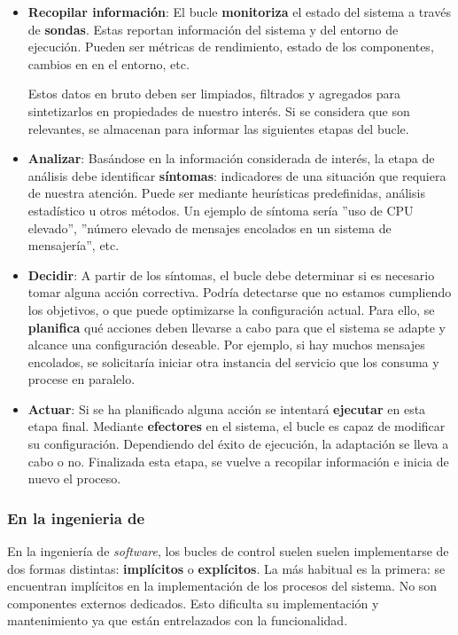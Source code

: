 \begin{itemize}
  \item \textbf{Recopilar información}: El bucle \textbf{monitoriza} el estado del sistema a través de \textbf{sondas}. Estas reportan información del sistema y del entorno de ejecución. Pueden ser métricas de rendimiento, estado de los componentes, cambios en en el entorno, etc.

  Estos datos en bruto deben ser limpiados, filtrados y agregados para sintetizarlos en propiedades de nuestro interés. Si se considera que son relevantes, se almacenan para informar las siguientes etapas del bucle.

  \item \textbf{Analizar}: Basándose en la información considerada de interés, la etapa de análisis debe identificar \textbf{síntomas}: indicadores de una situación que requiera de nuestra atención. Puede ser mediante heurísticas predefinidas, análisis estadístico u otros métodos. Un ejemplo de síntoma sería ''uso de CPU elevado'', ''número elevado de mensajes encolados en un sistema de mensajería'', etc.

  \item \textbf{Decidir}: A partir de los síntomas, el bucle debe determinar si es necesario tomar alguna acción correctiva. Podría detectarse que no estamos cumpliendo los objetivos, o que puede optimizarse la configuración actual. Para ello, se \textbf{planifica} qué acciones deben llevarse a cabo para que el sistema se adapte y alcance una configuración deseable. Por ejemplo, si hay muchos mensajes encolados, se solicitaría iniciar otra instancia del servicio que los consuma y procese en paralelo.

  \item \textbf{Actuar}: Si se ha planificado alguna acción se intentará \textbf{ejecutar} en esta etapa final. Mediante \textbf{efectores} en el sistema, el bucle es capaz de modificar su configuración. Dependiendo del éxito de ejecución, la adaptación se lleva a cabo o no. Finalizada esta etapa, se vuelve a recopilar información e inicia de nuevo el proceso.
\end{itemize}

\subsubsection{En la ingenieria de }

En la ingeniería de \emph{software}, los bucles de control suelen suelen implementarse de dos formas distintas: \textbf{implícitos} o \textbf{explícitos}. La más habitual es la primera: se encuentran implícitos en la implementación de los procesos del sistema. \cite{brunEngineeringSelfAdaptiveSystems2009} No son componentes externos dedicados. Esto dificulta su implementación y mantenimiento ya que están entrelazados con la funcionalidad.

